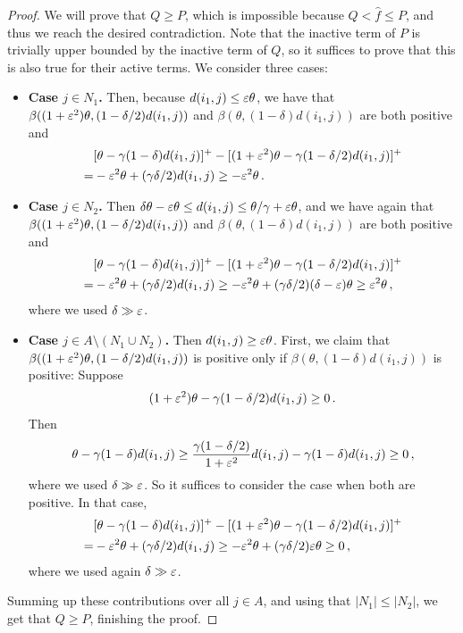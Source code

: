 \begin{proof}
We will prove that $Q \geq P$, which is impossible because $Q < \hat f \leq P$, and thus we reach the desired contradiction.
Note that the inactive term of $P$ is trivially upper bounded by the inactive term of $Q$, so it suffices to prove that this is also true for their active terms.
We consider three cases:
\begin{itemize}
    \item \textbf{Case $j \in N_1$.} 
    Then, because $d(i_1, j) \leq \varepsilon \theta$, we have that $\beta((1+\varepsilon^2)\theta, (1-\delta/2)d(i_1,j))$ and $\beta(\theta,(1-\delta)d(i_1,j))$ are both positive and
    \begin{align*}
    &[\theta - \gamma(1-\delta)d(i_1,j)]^+ - [(1+\varepsilon^2)\theta - \gamma(1-\delta/2)d(i_1,j)]^+\\
    =& -\varepsilon^2 \theta + (\gamma \delta / 2) d(i_1, j)
    \geq -\varepsilon^2 \theta\,.
    \end{align*}
    \item \textbf{Case $j \in N_2$.}
    Then $\delta \theta - \varepsilon \theta \leq d(i_1, j) \leq \theta / \gamma + \varepsilon \theta$, and we have again that $\beta((1+\varepsilon^2)\theta, (1-\delta/2)d(i_1,j))$ and $\beta(\theta,(1-\delta)d(i_1,j))$ are both positive and 
    \begin{align*}
    &[\theta - \gamma(1-\delta)d(i_1,j)]^+ - [(1+\varepsilon^2)\theta - \gamma(1-\delta/2)d(i_1,j)]^+\\
    =& -\varepsilon^2 \theta + (\gamma \delta / 2) d(i_1, j)
    \geq -\varepsilon^2 \theta + (\gamma \delta / 2)(\delta-\varepsilon)\theta
    \geq \varepsilon^2 \theta\,,
    \end{align*}
    where we used $\delta \gg \varepsilon$.
    \item \textbf{Case $j \in A \setminus (N_1 \cup N_2)$.}
    Then $d(i_1, j) \geq \varepsilon \theta$.
    First, we claim that $\beta((1+\varepsilon^2)\theta, (1-\delta/2)d(i_1,j))$ is positive only if $\beta(\theta,(1-\delta)d(i_1,j))$ is positive:
    Suppose
    \[(1+\varepsilon^2)\theta - \gamma(1-\delta/2)d(i_1, j) \geq 0\,.\]
    Then
    \begin{align*}
    \theta - \gamma (1-\delta) d(i_1, j)
    \geq \frac{\gamma(1-\delta/2)}{1+\varepsilon^2}d(i_1,j)-\gamma(1-\delta)d(i_1,j) \geq 0\,,
    \end{align*}
    where we used $\delta \gg \varepsilon$.
    So it suffices to consider the case when both are positive.
    In that case,
    \begin{align*}
    &[\theta - \gamma(1-\delta)d(i_1,j)]^+ - [(1+\varepsilon^2)\theta - \gamma(1-\delta/2)d(i_1,j)]^+\\
    =& -\varepsilon^2 \theta + (\gamma \delta / 2) d(i_1, j)
    \geq -\varepsilon^2 \theta + (\gamma \delta / 2) \varepsilon \theta
    \geq 0\,,
    \end{align*}
    where we used again $\delta \gg \varepsilon$.
\end{itemize}
Summing up these contributions over all $j \in A$, and using that $|N_1| \leq |N_2|$, we get that $Q \geq P$, finishing the proof.
\end{proof}

